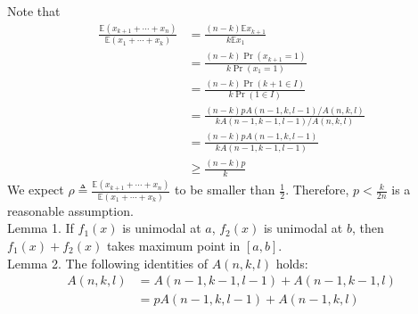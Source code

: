 \documentclass{article}
\begin{document}
Note that
\begin{displaymath}
\begin{split}
\frac{\mathbb{E}(x_{k+1}+\cdots+x_n)}{\mathbb{E}(x_1+\cdots+x_k)}&=\frac{(n-k)\mathbb{E}x_{k+1}}{k\mathbb{E}x_1}\\
&=\frac{(n-k)\Pr(x_{k+1}=1)}{k\Pr(x_1=1)}\\
&=\frac{(n-k)\Pr(k+1\in I)}{k\Pr(1\in I)}\\
&=\frac{(n-k)pA(n-1,k,l-1)/A(n,k,l)}{kA(n-1,k-1,l-1)/A(n,k,l)}\\
&=\frac{(n-k)pA(n-1,k,l-1)}{kA(n-1,k-1,l-1)}\\
&\geqslant \frac{(n-k)p}{k}
\end{split}
\end{displaymath}
We expect $\rho\triangleq \frac{\mathbb{E}(x_{k+1}+\cdots+x_n)}{\mathbb{E}(x_1+\cdots+x_k)}$ to be smaller than $\frac{1}{2}$. Therefore, $p<\frac{k}{2n}$ is a reasonable assumption.\\
Lemma 1. If $f_1(x)$ is unimodal at $a$, $f_2(x)$ is unimodal at $b$, then $f_1(x)+f_2(x)$ takes maximum point in $[a,b]$.\\
Lemma 2. The following identities of $A(n,k,l)$ holds:
\begin{equation}
\begin{split}
A(n,k,l)&=A(n-1,k-1,l-1)+A(n-1,k-1,l)\\
&=pA(n-1,k,l-1)+A(n-1,k,l)
\end{split}
\end{equation}
\end{document}

